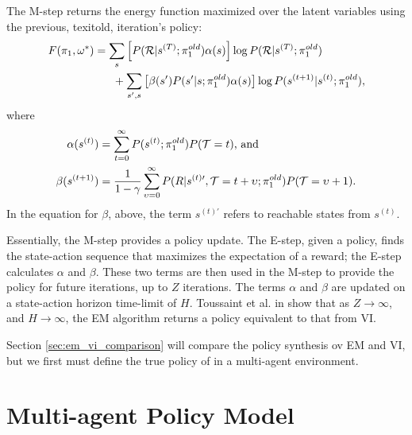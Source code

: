     \par
    The M-step returns the energy function maximized over the latent variables using the previous, texit{old},
    iteration's policy:
    \begin{equation} \label{eq:M_step}
        \begin{split}
            F(\pi_{1},\omega^*)
                & = \sum_s \left[ P(\mathcal{R}|s^{(T)};\pi_{1}^{old})\alpha(s)\right]
                        \log P(\mathcal{R}|s^{(T)};\pi_{1}^{old}) \\
                &\quad\ \ + \sum_{s',s}\left[ \beta(s')P(s'|s;\pi_{1}^{old})\alpha(s)\right]
                        \log P(s^{(t+1)}|s^{(t)};\pi_{1}^{old}),
        \end{split}
    \end{equation}
    where
    \begin{align*}
        \alpha(s^{(t)}) & = \sum_{t=0}^\infty P(s^{(t)}; \pi_{1}^{old})P(\mathcal{T}=t) \text{, and}\\
        \beta(s^{(t+1)}) & = \frac{1}{1-\gamma} \sum_{\upsilon=0}^{\infty}
            P(R|s^{(t)\prime},\mathcal{T}=t+\upsilon;\pi_{1}^{old})P(\mathcal{T}=\upsilon+1).
    \end{align*}
    \noindent
    In the equation for $\beta$, above, the term $s^{(t)\prime}$ refers to reachable states from $s^{(t)}$.

    Essentially, the M-step provides a policy update. The E-step, given a policy, finds the state-action sequence that
    maximizes the expectation of a reward; the E-step calculates $\alpha$ and $\beta$. These two terms are then used in
    the M-step to provide the policy for future iterations, up to $Z$ iterations. The terms $\alpha$ and $\beta$ are
    updated on a state-action horizon time-limit of $H$.  Toussaint et al. in \cite{toussaint2010expectation} show that
    as $Z\rightarrow{}\infty$, and $H\rightarrow{}\infty$, the EM algorithm returns a policy equivalent to that from VI.
    
    Section \ref{sec:em_vi_comparison} will compare the policy synthesis ov \ac{EM} and VI, but we first must define the true policy of  in a multi-agent environment.
    

	

\section{Multi-agent Policy Model}\label{sec:multi_agent_model}

